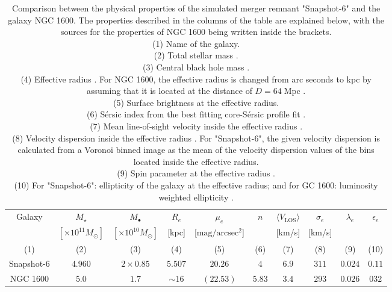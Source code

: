 \documentclass[english, oneside]{HYgradu}
\begin{document}
\begin{table}
	\begin{center}
		\scriptsize
		\begin{tabular}{c c c c c c c c c c}
		\hline
		\hline
		Galaxy & $M_\star$ & $M_\bullet$ & $R_e$ & $\mu_e$ & $n$ & 
		$\langle V_\mathrm{LOS} \rangle$ & $\sigma_e$ & $\lambda_e$ &
		$\epsilon_e$ \\
		& $[\times 10^{11} M_\odot]$ & $[\times 10^{10} M_\odot]$ &
		[kpc] & [$\mathrm{mag/arcsec^2}$] & & [km/s] & [km/s] & & \\
		(1) & (2) & (3) & (4) & (5) & (6) & (7) & (8) & (9) & (10) \\
		\hline
		Snapshot-6 & $4.960$ & $2 \times 0.85$ & $5.507$ & $20.26$ & $4$ & $6.9$ & $311$ & $0.024$ & $0.11$ \\
		NGC 1600 & $5.0$ & $1.7$ & $\sim 16$ & $(22.53)$ & $5.83$ & $3.4$ & 
		$293$ & $0.026$ & $032$ \\
		\hline
		\end{tabular}
	\end{center}
	\caption{Comparison between the physical properties of the simulated merger remnant "Snapshot-6" and the galaxy NGC 1600. The properties described in the columns of the table are explained below, with the sources for the properties of NGC 1600 being written inside the brackets. \\
	(1) Name of the galaxy. \\
	(2) Total stellar mass \citep{Thomas2016}. \\
	(3) Central black hole mass \citep{Thomas2016}. \\
	(4) Effective radius \citep{Thomas2016}. For NGC 1600, the effective radius is changed from arc seconds to kpc by assuming that it is located at the distance of $D = 64 \; \mathrm{Mpc}$ \citep{Thomas2016}. \\
	(5) Surface brightness at the effective radius. \\
	(6) Sérsic index from the best fitting core-Sérsic profile fit \citep{Thomas2016}. \\
	(7) Mean line-of-sight velocity inside the effective radius \citep{Bender1994}. \\
	(8) Velocity dispersion inside the effective radius \citep{Veale2017veldisp}. For "Snapshot-6", the given velocity dispersion is calculated from a Voronoi binned image as the mean of the velocity dispersion values of the bins located inside the effective radius. \\
	(9) Spin parameter at the effective radius \citep{Veale2018lambda}. \\
	(10) For "Snapshot-6": ellipticity of the galaxy at the effective radius; and for GC 1600: luminosity weighted ellipticity \citep{Goullaud2018}.
	}
\end{table}
\end{document}
